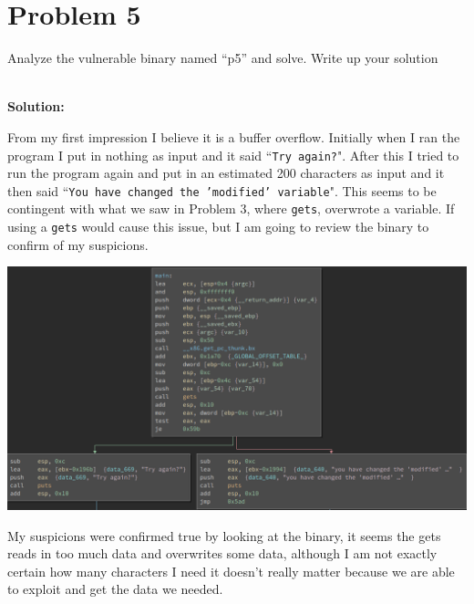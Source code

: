 \documentclass[12pt]{article}
\newcommand\tab[1][0.5cm]{\hspace*{#1}}
\begin{document}
\section{Problem 5}
\tab Analyze the vulnerable binary named “p5” and solve. Write up your solution

\textbf{\\Solution:\\}

\tab From my first impression I believe it is a buffer overflow. Initially when I ran the program
I put in nothing as input and it said ``\texttt{Try again?}". After this I tried to run the program
again and put in an estimated 200 characters as input and it then said ``\texttt{You have changed the 'modified'
variable}". This seems to be contingent with what we saw in Problem 3, where \texttt{gets}, overwrote a variable. If
using a \texttt{gets} would cause this issue, but I am going to review the binary to confirm of my suspicions.
\begin{center}
	\includegraphics[scale=.4]{photos/p5pic1}
\end{center}

My suspicions were confirmed true by looking at the binary, it seems the gets reads in too much data and overwrites some data,
although I am not exactly certain how many characters I need it doesn't really matter because we are able to exploit and get
the data we needed. 


\end{document}
